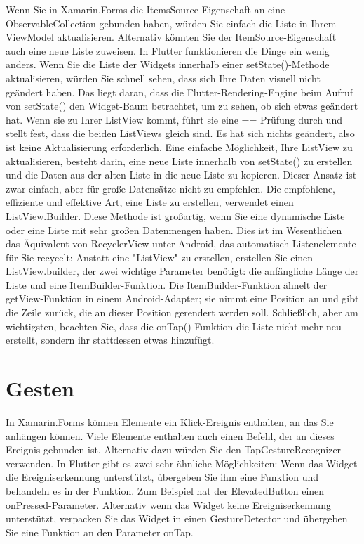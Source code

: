Wenn Sie in Xamarin.Forms die ItemsSource-Eigenschaft an eine ObservableCollection gebunden haben, würden Sie einfach die Liste in Ihrem ViewModel aktualisieren. Alternativ könnten Sie der ItemSource-Eigenschaft auch eine neue Liste zuweisen. In Flutter funktionieren die Dinge ein wenig anders. Wenn Sie die Liste der Widgets innerhalb einer setState()-Methode aktualisieren, würden Sie schnell sehen, dass sich Ihre Daten visuell nicht geändert haben. Das liegt daran, dass die Flutter-Rendering-Engine beim Aufruf von setState() den Widget-Baum betrachtet, um zu sehen, ob sich etwas geändert hat. Wenn sie zu Ihrer ListView kommt, führt sie eine == Prüfung durch und stellt fest, dass die beiden ListViews gleich sind. Es hat sich nichts geändert, also ist keine Aktualisierung erforderlich. Eine einfache Möglichkeit, Ihre ListView zu aktualisieren, besteht darin, eine neue Liste innerhalb von setState() zu erstellen und die Daten aus der alten Liste in die neue Liste zu kopieren. Dieser Ansatz ist zwar einfach, aber für große Datensätze nicht zu empfehlen. Die empfohlene, effiziente und effektive Art, eine Liste zu erstellen, verwendet einen ListView.Builder. Diese Methode ist großartig, wenn Sie eine dynamische Liste oder eine Liste mit sehr großen Datenmengen haben. Dies ist im Wesentlichen das Äquivalent von RecyclerView unter Android, das automatisch Listenelemente für Sie recycelt:
Anstatt eine "ListView" zu erstellen, erstellen Sie einen ListView.builder, der zwei wichtige Parameter benötigt: die anfängliche Länge der Liste und eine ItemBuilder-Funktion. Die ItemBuilder-Funktion ähnelt der getView-Funktion in einem Android-Adapter; sie nimmt eine Position an und gibt die Zeile zurück, die an dieser Position gerendert werden soll. Schließlich, aber am wichtigsten, beachten Sie, dass die onTap()-Funktion die Liste nicht mehr neu erstellt, sondern ihr stattdessen etwas hinzufügt.



\section{Gesten}
In Xamarin.Forms können Elemente ein Klick-Ereignis enthalten, an das Sie anhängen können. Viele Elemente enthalten auch einen Befehl, der an dieses Ereignis gebunden ist. Alternativ dazu würden Sie den TapGestureRecognizer verwenden. In Flutter gibt es zwei sehr ähnliche Möglichkeiten: Wenn das Widget die Ereigniserkennung unterstützt, übergeben Sie ihm eine Funktion und behandeln es in der Funktion. Zum Beispiel hat der ElevatedButton einen onPressed-Parameter. Alternativ wenn das Widget keine Ereigniserkennung unterstützt, verpacken Sie das Widget in einen GestureDetector und übergeben Sie eine Funktion an den Parameter onTap.

